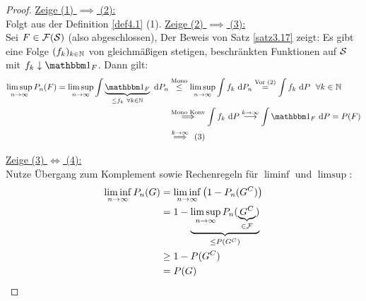 \begin{proof}
\underline{Zeige (1) $\implies$ (2):}\\
Folgt aus der Definition \ref{def4.1} (1).\nl
\underline{Zeige (2) $\implies$ (3):}\\
Sei $F\in\F(\S)$ (also abgeschlossen), Der Beweis von Satz \ref{satz3.17} zeigt: Es gibt eine Folge $(f_k)_{k\in\N}$ von gleichmäßigen stetigen, beschränkten Funktionen auf $\S$ mit $f_k\downarrow\indi_F$. Dann gilt:
\begin{align*}
\limsup\limits_{n\to\infty} P_n(F)
=\limsup\limits_{n\to\infty}\int\limits\underbrace{\indi_F}_{\leq f_k~\forall k\in\N}\d P_n
&\stackrel{\text{Mono}}{\leq}
\limsup\limits_{n\to\infty}\int\limits f_k\d P_n
\stackrel{\text{Vor (2)}}{=}
\int\limits f_k\d P~~\forall k\in\N\\
&\stackrel{\text{Mono Konv}}{\implies}
\int\limits f_k\d P\stackrel{k\to\infty}{\longrightarrow}
\int\limits\indi_F\d P=P(F)\\
&\stackrel{k\to\infty}{\implies}~(3)
\end{align*}

\underline{Zeige (3) $\Longleftrightarrow$ (4):}\\
Nutze Übergang zum Komplement sowie Rechenregeln für $\liminf$ und $\limsup$:
\begin{align*}
\liminf\limits_{n\to\infty} P_n(G)
&=\liminf\limits_{n\to\infty} \big(1-P_n(G^C)\big)\\
&=1-\underbrace{\limsup\limits_{n\to\infty} P_n(\underbrace{G^C}_{\in\F})}_{\leq P(G^C)}\\
&\geq 1-P(G^C)\\
&=P(G)
\end{align*}


\end{proof}
